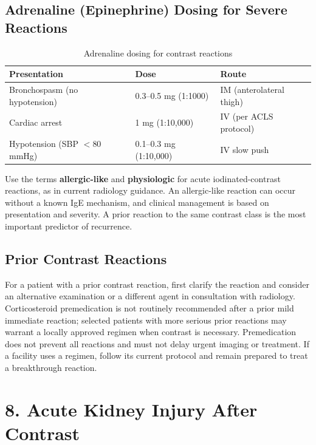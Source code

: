 \subsection*{Adrenaline (Epinephrine) Dosing for Severe Reactions}

\begin{table}[h]
\centering
\caption{Adrenaline dosing for contrast reactions}
\begin{tabular}{|p{}|p{}|p{}|}
\hline
\textbf{Presentation} & \textbf{Dose} & \textbf{Route} \\
\hline
Bronchospasm (no hypotension) & 0.3--0.5 mg (1:1000) & IM (anterolateral thigh) \\
\hline
Cardiac arrest & 1 mg (1:10,000) & IV (per ACLS protocol) \\
\hline
Hypotension (SBP $<$80 mmHg) & 0.1--0.3 mg (1:10,000) & IV slow push \\
\hline
\end{tabular}
\end{table}

\begin{pearlbox}
Use the terms \textbf{allergic-like} and \textbf{physiologic} for acute iodinated-contrast reactions, as in current radiology guidance. An allergic-like reaction can occur without a known IgE mechanism, and clinical management is based on presentation and severity. A prior reaction to the same contrast class is the most important predictor of recurrence.
\end{pearlbox}

\subsection*{Prior Contrast Reactions}
For a patient with a prior contrast reaction, first clarify the reaction and consider an alternative examination or a different agent in consultation with radiology. Corticosteroid premedication is not routinely recommended after a prior mild immediate reaction; selected patients with more serious prior reactions may warrant a locally approved regimen when contrast is necessary. Premedication does not prevent all reactions and must not delay urgent imaging or treatment. If a facility uses a regimen, follow its current protocol and remain prepared to treat a breakthrough reaction.


\section*{8. Acute Kidney Injury After Contrast}

